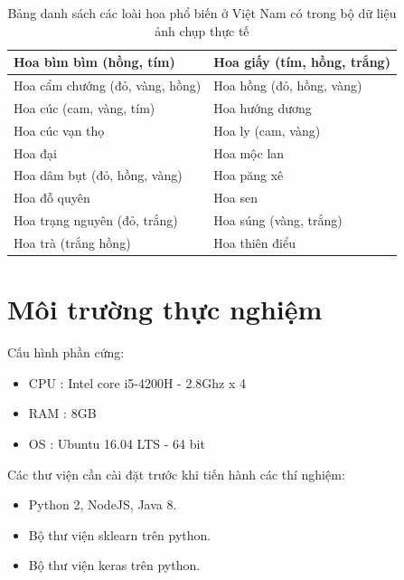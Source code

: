 \documentclass[12pt]{report}
\begin{document}
								
		\begin{table}[h]
			\centering
			\caption{Bảng danh sách các loài hoa phổ biến ở Việt Nam có trong bộ dữ liệu ảnh chụp thực tế}
			\label{tbl:table danh sach hoa vn}
			\begin{tabular}{|l|l|}
				\hline
				Hoa bìm bìm (hồng, tím)               & Hoa giấy (tím, hồng, trắng) \\ \hline
				Hoa cẩm chướng (đỏ, vàng, hồng) & Hoa hồng (đỏ, hồng, vàng)  \\ \hline
				Hoa cúc (cam, vàng, tím)                & Hoa hướng dương               \\ \hline       
				Hoa cúc vạn thọ                       & Hoa ly (cam, vàng)                \\ \hline     
				Hoa đại                                 & Hoa mộc lan                      \\ \hline       
				Hoa dâm bụt (đỏ, hồng, vàng)      & Hoa păng xê                      \\ \hline 
				Hoa đỗ quyên                           & Hoa sen                            \\ \hline      
				Hoa trạng nguyên (đỏ, trắng)       & Hoa súng (vàng, trắng)         \\ \hline
				Hoa trà (trắng hồng)                  & Hoa thiên điểu                 \\ \hline   			
			\end{tabular}
		\end{table}
				
		\section{Môi trường thực nghiệm}
		Cấu hình phần cứng:
		\begin{itemize}
			\item CPU	: Intel core i5-4200H - 2.8Ghz x 4
			\item RAM	: 8GB
			\item OS	: Ubuntu 16.04 LTS - 64 bit
		\end{itemize}
				
				
		Các thư viện cần cài đặt trước khi tiến hành các thí nghiệm:
				
		\begin{itemize}
			\item Python 2, NodeJS, Java 8.
			\item Bộ thư viện sklearn trên python.
			\item Bộ thư viện keras trên python.
		\end{itemize}
						
\end{document}
